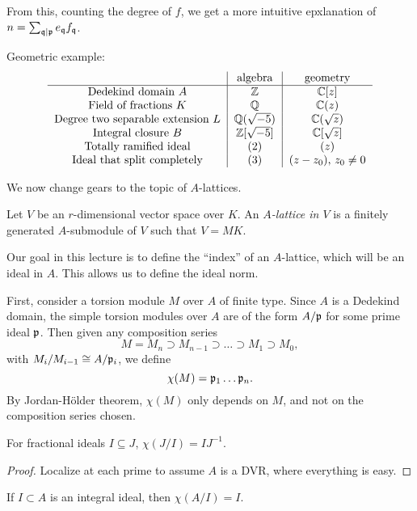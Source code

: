 \documentclass[11pt]{amsart}
\begin{document}
From this, counting the degree of $f$, we get a more intuitive epxlanation of $n = \sum_{\mathfrak{q}\mid \mathfrak{p}} e_{\mathfrak{q}}f_{\mathfrak{q}}$.

Geometric example:
\[
\begin{tabular}{c|c|c}
& algebra & geometry \\
\hline
Dedekind domain $A$ & $\ZZ$ & $\CC[z]$ \\
Field of fractions $K$ & $\QQ$ & $\CC(z)$ \\
Degree two separable extension $L$ & $\QQ(\sqrt{-5})$ & $\CC(\sqrt{z})$ \\
Integral closure $B$ & $\ZZ[\sqrt{-5}]$ & $\CC[\sqrt{z}]$ \\
Totally ramified ideal & $(2)$ & $(z)$ \\
Ideal that split completely & $(3)$ & $(z-z_0)$, $z_0\neq 0$
\end{tabular}
\]

We now change gears to the topic of $A$-lattices.

\begin{defn}
Let $V$ be an $r$-dimensional vector space over $K$. An \emph{$A$-lattice in $V$} is a finitely generated $A$-submodule of $V$ such that $V = MK$.
\end{defn}

Our goal in this lecture is to define the ``index'' of an $A$-lattice, which will be an ideal in $A$. This allows us to define the ideal norm.

First, consider a torsion module $M$ over $A$ of finite type. Since $A$ is a Dedekind domain, the simple torsion modules over $A$ are of the form $A/\mathfrak{p}$ for some prime ideal $\mathfrak{p}$. Then given any composition series
\[M = M_n \supset M_{n-1} \supset\dots\supset M_1\supset M_0,\]
with $M_i/M_{i-1} \cong A/\mathfrak{p}_i$, we define
\[\chi(M) = \mathfrak{p}_1\dots\mathfrak{p}_n.\]
By Jordan-H\"older theorem, $\chi(M)$ only depends on $M$, and not on the composition series chosen.

\begin{prop}
For fractional ideals $I\subseteq J$, $\chi(J/I) = IJ^{-1}$.
\end{prop}

\begin{proof}
Localize at each prime to assume $A$ is a DVR, where everything is easy. 
\end{proof}

\begin{cor}
If $I\subset A$ is an integral ideal, then $\chi(A/I) = I$.
\end{cor}
\end{document}
